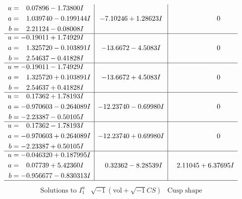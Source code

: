 \documentclass[1p]{elsarticle_modified}
\theoremstyle{definition}
\newcommand{\I}{\sqrt{-1}}
\begin{document}
$$\begin{array}{c|c|c}
\begin{aligned}
u &= \phantom{-}0.07896 - 1.73800 I \\
a &= \phantom{-}1.039740 - 0.199144 I \\
b &= \phantom{-}2.21124 - 0.08008 I\end{aligned}
 & -7.10246 + 1.28623 I & \phantom{-0.000000 } 0 \\ \hline\begin{aligned}
u &= -0.19011 + 1.74929 I \\
a &= \phantom{-}1.325720 - 0.103891 I \\
b &= \phantom{-}2.54637 - 0.41828 I\end{aligned}
 & -13.6672 - 4.5083 I & \phantom{-0.000000 } 0 \\ \hline\begin{aligned}
u &= -0.19011 - 1.74929 I \\
a &= \phantom{-}1.325720 + 0.103891 I \\
b &= \phantom{-}2.54637 + 0.41828 I\end{aligned}
 & -13.6672 + 4.5083 I & \phantom{-0.000000 } 0 \\ \hline\begin{aligned}
u &= \phantom{-}0.17362 + 1.78193 I \\
a &= -0.970603 - 0.264089 I \\
b &= -2.23387 - 0.50105 I\end{aligned}
 & -12.23740 - 0.69980 I & \phantom{-0.000000 } 0 \\ \hline\begin{aligned}
u &= \phantom{-}0.17362 - 1.78193 I \\
a &= -0.970603 + 0.264089 I \\
b &= -2.23387 + 0.50105 I\end{aligned}
 & -12.23740 + 0.69980 I & \phantom{-0.000000 } 0 \\ \hline\begin{aligned}
u &= -0.046320 + 0.187995 I \\
a &= \phantom{-}0.07739 + 5.42360 I \\
b &= -0.956677 - 0.830313 I\end{aligned}
 & \phantom{-}0.32362 - 8.28539 I & \phantom{-}2.11045 + 6.37695 I\\
 \hline 
 \end{array}$$\newpage$$\begin{array}{c|c|c}  
\text{Solutions to }I^u_{1}& \I (\text{vol} + \sqrt{-1}CS) & \text{Cusp shape}\\
 \hline 
\begin{aligned}

\end{aligned}
\end{array}$$
\end{document}
